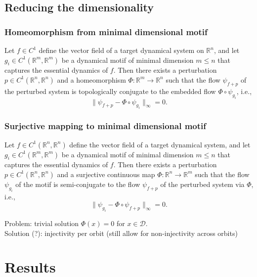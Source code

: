 \documentclass{article}
\theoremstyle{definition} \newtheorem{definition}{Definition}  \newtheorem{example}{Example}
\theoremstyle{remark} \newtheorem{remark}{Remark}
\newcounter{ct}
\begin{document}
\subsection{Reducing the dimensionality} %
\subsubsection{Homeomorphism from minimal dimensional motif}
Let \( f \in C^1 \) define the vector field of a target dynamical system on \( \mathbb{R}^n \), and let \( g_i \in C^1(\mathbb{R}^m, \mathbb{R}^m) \) be a dynamical motif of minimal dimension \( m \leq n \) that captures the essential dynamics of \( f \). Then there exists a perturbation \( p \in C^1(\mathbb{R}^n, \mathbb{R}^n) \) and a homeomorphism \( \Phi: \mathbb{R}^m \to \mathbb{R}^n \) such that the flow \( \psi_{f+p} \) of the perturbed system is topologically conjugate to the embedded flow \( \Phi \circ \psi_{g_i} \), i.e.,
\begin{equation}\label{eq:hom_from_motif}
\|\psi_{f+p} - \Phi \circ \psi_{g_i} \|_\infty = 0.
\end{equation}


\subsubsection{Surjective mapping to minimal dimensional motif}
Let \( f \in C^1(\mathbb{R}^n, \mathbb{R}^n) \) define the vector field of a target dynamical system, and let \( g_i \in C^1(\mathbb{R}^m, \mathbb{R}^m) \) be a dynamical motif of minimal dimension \( m \leq n \) that captures the essential dynamics of \( f \). Then there exists a perturbation \( p \in C^1(\mathbb{R}^n, \mathbb{R}^n) \) and a surjective continuous map \( \Phi: \mathbb{R}^n \to \mathbb{R}^m \) such that the flow \( \psi_{g_i} \) of the motif is semi-conjugate to the flow \( \psi_{f+p} \) of the perturbed system via \( \Phi \), i.e.,
\begin{equation}\label{eq:perfect_motif_fit}
\| \psi_{g_i} - \Phi \circ \psi_{f+p} \|_\infty = 0.
\end{equation}


Problem: trivial solution $\Phi(x) = 0$ for $x\in\mathcal{D}$.\\
Solution (?): injectivity per orbit (still allow for non-injectivity across orbits)



\section{Results}
\end{document}
